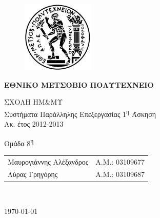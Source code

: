 \begin{titlepage}
\begin{center}
\begin{figure}[t] 
     \includegraphics[scale=0.7]{title/ntua_logo}
\end{figure}
\begin{LARGE}\textbf{ΕΘΝΙΚΟ ΜΕΤΣΟΒΙΟ ΠΟΛΥΤΕΧΝΕΙΟ\\}\end{LARGE}
\vspace{2cm}
\begin{Large}
ΣΧΟΛΗ ΗΜ\&ΜΥ\\
Συστήματα Παράλληλης Επεξεργασίας
1\textsuperscript{η} Άσκηση\\
Ακ. έτος 2012-2013\\
\end{Large}
\vspace{5cm}
\Large Ομάδα 8\textsuperscript{η}\\
\vspace{1cm}
\begin{tabular}{l r}
\Large{Μαυρογιάννης Αλέξανδρος}&
\large{Α.Μ.: 03109677}\\
\Large{Λύρας Γρηγόρης}&
\large{Α.Μ.: 03109687}\\
\end{tabular}\\
\vspace{5cm}

\vfill
\large\today\\
\end{center}
\end{titlepage}

